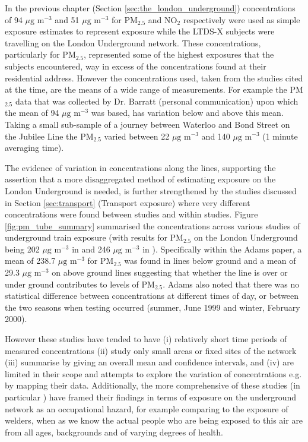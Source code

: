 In the previous chapter (Section \ref{sec:the_london_underground}) concentrations of 94 $\mu \text{g m}^{-3}$ and 51 $\mu \text{g m}^{-3}$ for PM$_{2.5}$ and NO$_{2}$ respectively were used as simple exposure estimates to represent exposure while the LTDS-X subjects were travelling on the London Underground network. These concentrations, particularly for PM$_{2.5}$, represented some of the highest exposures that the subjects encountered, way in excess of the concentrations found at their residential address. However the concentrations used, taken from the studies cited at the time, are the means of a wide range of measurements. For example the PM$_{2.5}$ data that was collected by Dr. Barratt (personal communication) upon which the mean of 94 $\mu \text{g m}^{-3}$ was based, has variation below and above this mean. Taking a small sub-sample of a journey between Waterloo and Bond Street on the Jubilee Line the PM$_{2.5}$ varied between 22 $\mu \text{g m}^{-3}$ and 140 $\mu \text{g m}^{-3}$ (1 minute averaging time).

The evidence of variation in concentrations along the lines, supporting the assertion that a more disaggregated method of estimating exposure on the London Underground is needed, is further strengthened by the studies discussed in Section \ref{sec:transport} (Transport exposure) where very different concentrations were found between studies and within studies. Figure \ref{fig:pm_tube_summary}  summarised the concentrations across various studies of underground train exposure (with results for PM$_{2.5}$ on the London Underground being 202 $\mu \text{g m}^{-3}$ in \cite{Adams2001} and 246 $\mu \text{g m}^{-3}$ in \cite{Pfeifer1999a}). Specifically within the Adams paper, a mean of 238.7 $\mu \text{g m}^{-3}$ for PM$_{2.5}$ was found in lines below ground and a mean of 29.3 $\mu \text{g m}^{-3}$ on above ground lines suggesting that whether the line is over or under ground contributes to levels of PM$_{2.5}$. Adams also noted that there was no statistical difference between concentrations at different times of day, or between the two seasons when testing occurred (summer, June 1999 and winter, February 2000).

However these studies have tended to have (i) relatively short time periods of measured concentrations (ii) study only small areas or fixed sites of the network (iii) summarise by giving an overall mean and confidence intervals, and (iv) are limited in their scope and attempts to explore the variation of concentrations e.g. by mapping their data. Additionally, the more comprehensive of these studies (in particular \cite{Hurley2003}) have framed their findings in terms of exposure on the underground network as an occupational hazard, for example comparing to the exposure of welders, when as we know the actual people who are being exposed to this air are from all ages, backgrounds and of varying degrees of health.

